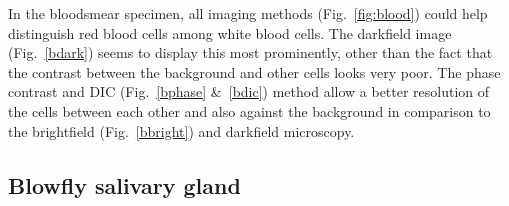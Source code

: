 In the bloodsmear specimen, all imaging methods (Fig.~\ref{fig:blood}) could help distinguish red blood cells among white blood cells. 
The darkfield image (Fig.~\ref{bdark}) seems to display this most prominently, other than the fact that the contrast between the background and other cells looks very poor. 
The phase contrast and DIC (Fig.~\ref{bphase} \&~\ref{bdic}) method allow a better resolution of the cells between each other and also against the background in comparison to the brightfield (Fig.~\ref{bbright}) and darkfield microscopy. 

\subsection{Blowfly salivary gland}

